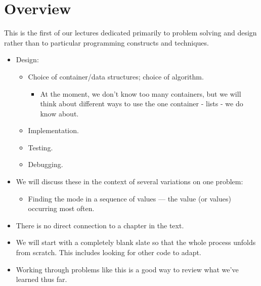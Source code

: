 \documentclass[letterpaper,10pt,english]{sphinxmanual}
\begin{document}
\section{Overview}
\label{\detokenize{lecture_notes/lec14_design_part1:overview}}
This is the first of our lectures dedicated primarily to problem
solving and design rather than to particular programming constructs
and techniques.
\begin{itemize}
\item {} 
Design:
\begin{itemize}
\item {} 
Choice of container/data structures; choice of algorithm.
\begin{itemize}
\item {} 
At the moment, we don’t know too many containers, but we will
think about different ways to use the one container - lists -
we do know about.

\end{itemize}

\item {} 
Implementation.

\item {} 
Testing.

\item {} 
Debugging.

\end{itemize}

\item {} 
We will discuss these in the context of several variations on one
problem:
\begin{itemize}
\item {} 
Finding the mode in a sequence of values — the value (or values)
occurring most often.

\end{itemize}

\item {} 
There is no direct connection to a chapter in the text.

\item {} 
We will start with a completely blank slate so that the whole process
unfolds from scratch. This includes looking for other code to
adapt.

\item {} 
Working through problems like this is a good way to review what
we’ve learned thus far.

\end{itemize}
\end{document}
